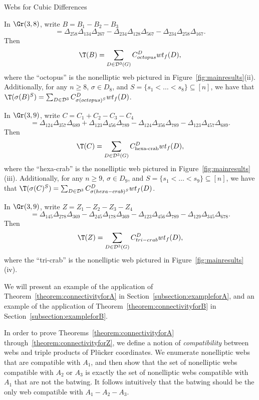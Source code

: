 \begin{subsection}{Webs for Cubic Differences}
\begin{theorem} \label{theorem:connectivityforB} 
In $\Gr(3,8)$, write $B=B_1-B_2-B_3$\[ = \Delta_{258}\Delta_{134}\Delta_{267} - \Delta_{234}\Delta_{128}\Delta_{567}-\Delta_{234}\Delta_{258}\Delta_{167}.\]
Then \[\T(B)=\sum_{D \in \mathcal{D}^3(G)} C_{octopus}^D wt_f(D),\]
where the ``octopus'' is the nonelliptic web pictured in Figure~\ref{fig:mainresults}(ii).
Additionally, for any $n \geq 8$, $\sigma \in D_8$, and $S=\{s_1<\dots<s_8\} \subseteq [n]$, we have that $\T(\sigma(B)^S)=\sum_{D \in \mathcal{D}^3} C_{\sigma(octopus)^S}^D wt_f(D)$.
\end{theorem}

\begin{theorem} \label{theorem:connectivityforC}
In $\Gr(3,9)$, write $C = C_1+C_2-C_3-C_4$\[= \Delta_{124}\Delta_{357}\Delta_{689} + \Delta_{123}\Delta_{456}\Delta_{789}- \Delta_{124}\Delta_{356}\Delta_{789} - \Delta_{123}\Delta_{457}\Delta_{689}.\]
Then \[\T(C)=\sum_{D \in \mathcal{D}^3(G)} C_{\textrm{hexa-crab}}^D wt_f(D),\]
where the ``hexa-crab'' is the nonelliptic web pictured in Figure~\ref{fig:mainresults}(iii).
Additionally, for any $n \geq 9$, $\sigma \in D_9$, and $S=\{s_1<\dots<s_9\} \subseteq [n]$, we have that $\T(\sigma(C)^S)=\sum_{D \in \mathcal{D}^3} C_{\sigma(hexa-crab)^S}^D wt_f(D)$.
\end{theorem}

\begin{theorem} \label{theorem:connectivityforZ}
In $\Gr(3,9)$, write $Z = Z_1 - Z_2 - Z_3 - Z_4 $ 
\[=\Delta_{145} \Delta_{278} \Delta_{369} - \Delta_{245} \Delta_{178} \Delta_{369} - \Delta_{123}\Delta_{456}\Delta_{789} - \Delta_{129}\Delta_{345}\Delta_{678}.\]
Then \[\T(Z)=\sum_{D \in \mathcal{D}^3(G)} C_{tri-crab}^D wt_f(D),\]
where the ``tri-crab'' is the nonelliptic web pictured in Figure~\ref{fig:mainresults}(iv).
\end{theorem}

We will present an example of the application of Theorem~\ref{theorem:connectivityforA} in Section~\ref{subsection:exampleforA}, and an example of the application of Theorem~\ref{theorem:connectivityforB} in Section~\ref{subsection:exampleforB}.

In order to prove Theorems~\ref{theorem:connectivityforA} through~\ref{theorem:connectivityforZ}, we define a notion of \textit{compatibility} between webs and triple products of Pl{\"u}cker coordinates. We enumerate nonelliptic webs that are compatible with $A_1$, and then show that the set of nonelliptic webs compatible with $A_2$ or $A_3$ is exactly the set of nonelliptic webs compatible with $A_1$ that are not the batwing. It follows intuitively that the batwing should be the only web compatible with $A_1-A_2-A_3$.


\end{subsection}

